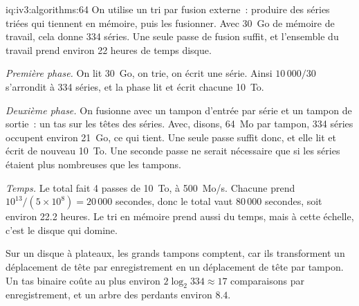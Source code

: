 \begin{solution}{iq:iv3:algorithms:64}
On utilise un tri par fusion externe~: produire des séries triées qui tiennent en mémoire, puis les fusionner. Avec 30~Go de mémoire de travail, cela donne 334 séries. Une seule passe de fusion suffit, et l'ensemble du travail prend environ 22 heures de temps disque.
\enlargethispage{-3\baselineskip}%
\label{lst:iv3:al:external}

\emph{Première phase.} On lit 30~Go, on trie, on écrit une série. Ainsi $10\,000 / 30$ s'arrondit à 334 séries, et la phase lit et écrit chacune 10~To.

\emph{Deuxième phase.} On fusionne avec un tampon d'entrée par série et un tampon de sortie~: un tas sur les têtes des séries. Avec, disons, 64~Mo par tampon, 334 séries occupent environ 21~Go, ce qui tient. Une seule passe suffit donc, et elle lit et écrit de nouveau 10~To. Une seconde passe ne serait nécessaire que si les séries étaient plus nombreuses que les tampons.

\emph{Temps.} Le total fait 4 passes de 10~To, à 500~Mo/s. Chacune prend $10^{13} / (5 \times 10^8) = 20\,000$ secondes, donc le total vaut $80\,000$ secondes, soit environ 22.2 heures. Le tri en mémoire prend aussi du temps, mais à cette échelle, c'est le disque qui domine.

Sur un disque à plateaux, les grands tampons comptent, car ils transforment un déplacement de tête par enregistrement en un déplacement de tête par tampon. Un tas binaire coûte au plus environ $2 \log_2 334 \approx 17$ comparaisons par enregistrement, et un arbre des perdants environ $8.4$.

\end{solution}

